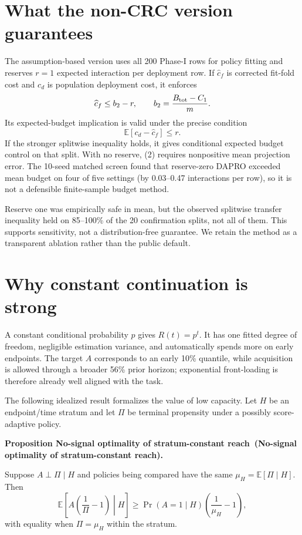 \documentclass[10pt]{article}
\newcounter{proposition}
\newenvironment{proposition}[1][]{%
  \refstepcounter{proposition}\par\medskip\noindent
  \textbf{Proposition \theproposition\ifx\relax#1\relax\else\ (#1)\fi.}\ \itshape
}{\par\medskip}
\newcounter{assumption}
\newcommand{\E}{\mathbb{E}}
\begin{document}
\section{What the non-CRC version guarantees}

The assumption-based version uses all 200 Phase-I rows for policy fitting and
reserves $r=1$ expected interaction per deployment row.  If $\widehat c_f$ is
corrected fit-fold cost and $c_d$ is population deployment cost, it enforces
\[
\widehat c_f\le b_2-r,
\qquad
b_2=\frac{B_{\rm tot}-C_1}{m}.
\]
Its expected-budget implication is valid under the precise condition
\[
\E[c_d-\widehat c_f]\le r.
\tag{2}
\]
If the stronger splitwise inequality holds, it gives conditional expected
budget control on that split.  With no reserve, (2) requires nonpositive mean
projection error.  The 10-seed matched screen found that reserve-zero DAPRO
exceeded mean budget on four of five settings (by 0.03--0.47 interactions per
row), so it is not a defensible finite-sample budget method.

Reserve one was empirically safe in mean, but the observed splitwise transfer
inequality held on 85--100\% of the 20 confirmation splits, not all of them.
This supports sensitivity, not a distribution-free guarantee.  We retain the
method as a transparent ablation rather than the public default.

\section{Why constant continuation is strong}

A constant conditional probability $p$ gives $R(t)=p^t$.  It has one fitted
degree of freedom, negligible estimation variance, and automatically spends
more on early endpoints.  The target $A$ corresponds to an early 10\%
quantile, while acquisition is allowed through a broader 56\% prior horizon;
exponential front-loading is therefore already well aligned with the task.

The following idealized result formalizes the value of low capacity.  Let
$H$ be an endpoint/time stratum and let $\Pi$ be terminal propensity under a
possibly score-adaptive policy.

\begin{proposition}[No-signal optimality of stratum-constant reach]
Suppose $A\perp\Pi\mid H$ and policies being compared have the same
$\mu_H=\E[\Pi\mid H]$.  Then
\[
\E\!\left[A\left(\frac1\Pi-1\right)\middle|H\right]
\ge
\Pr(A=1\mid H)\left(\frac1{\mu_H}-1\right),
\]
with equality when $\Pi=\mu_H$ within the stratum.
\end{proposition}
\end{document}
